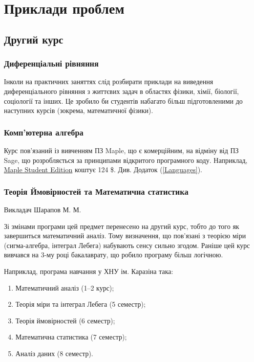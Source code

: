 \documentclass[14pt, a4paper]{extarticle}  %
\begin{document}
\section{Приклади проблем}
\subsection{Другий курс}

\subsubsection{Диференціальні рівняння}

Інколи на практичних заняттях слід розбирати приклади на виведення диференціального рівняння з життєвих задач в областях фізики, хімії, біології, соціології та інших. Це зробило би студентів набагато більш підготовленими до наступних курсів (зокрема, математичної фізики). 


\subsubsection{Комп'ютерна алгебра}

Курс пов'язаний із вивченням ПЗ Maple, що є комерційним, на відміну від ПЗ Sage, що розробляється за принципами відкритого програмного коду. Наприклад, \href{https://webstore.maplesoft.com/catalog.aspx}{Maple Student Edition} коштує 124 \$. Див. Додаток (\ref{Languages}). 

\subsubsection{Теорія Ймовірностей та Математична статистика}
Викладач Шарапов М. М. 

Зі змінами програми цей предмет перенесено на другий курс, тобто до того як завершиться математичний аналіз. Тому визначення, що пов'язані з теорією міри (сигма-алгебра, інтеграл Лебега) набувають сенсу сильно згодом. Раніше цей курс вивчався на 3-му році бакалаврату, що робило програму більш логічною. 

Наприклад, програма навчання у ХНУ ім. Каразіна така: 
\begin{enumerate}
    \item Математичний аналіз (1--2 курс);
    \item Теорія міри та інтеграл Лебега (5 семестр);
    \item Теорія ймовірностей (6 семестр);
    \item Математична статистика (7 семестр);
    \item Аналіз даних (8 семестр).
\end{enumerate}
\end{document}
